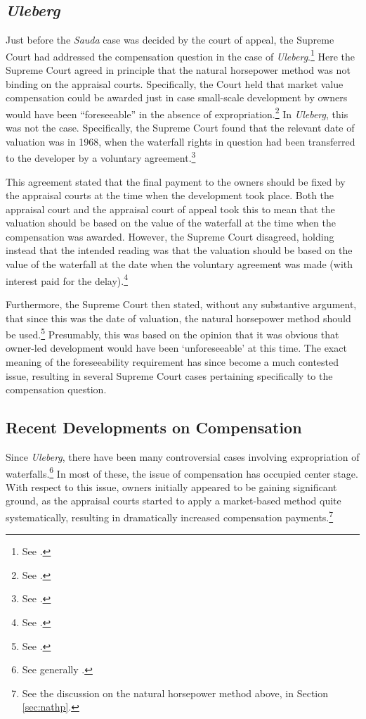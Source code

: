 \subsection{{\it Uleberg}}\label{sec:5:5:2}

Just before the {\it Sauda} case was decided by the court of appeal, the Supreme Court had addressed the compensation question in the case of {\it Uleberg}.\footnote{See \cite{uleberg08}.} Here the Supreme Court agreed in principle that the natural horsepower method was not binding on the appraisal courts. Specifically, the Court held that market value compensation could be awarded just in case small-scale development by owners would have been ``foreseeable'' in the absence of expropriation.\footnote{See \cite[81]{uleberg08}.} In {\it Uleberg}, this was not the case. Specifically, the Supreme Court found that the relevant date of valuation was in 1968, when the waterfall rights in question had been transferred to the developer by a voluntary agreement.\footnote{See \cite[70]{uleberg08}.}

This agreement stated that the final payment to the owners should be fixed by the appraisal courts at the time when the development took place. Both the appraisal court and the appraisal court of appeal took this to mean that the valuation should be based on the value of the waterfall at the time when the compensation was awarded. However, the Supreme Court disagreed, holding instead that the intended reading was that the valuation should be based on the value of the waterfall at the date when the voluntary agreement was made (with interest paid for the delay).\footnote{See \cite[71]{uleberg08}.}

Furthermore, the Supreme Court then stated, without any substantive argument, that since this was the date of valuation, the natural horsepower method should be used.\footnote{See \cite[62]{uleberg08}.} Presumably, this was based on the opinion that it was obvious that owner-led development would have been `unforeseeable' at this time. The exact meaning of the foreseeability requirement has since become a much contested issue, resulting in several Supreme Court cases pertaining specifically to the compensation question.

\subsection{Recent Developments on Compensation}\label{sec:5:5:3}

Since {\it Uleberg}, there have been many controversial cases involving expropriation of waterfalls.\footnote{See generally \cite{larsen06,larsen08,larsen12}.} In most of these, the issue of compensation has occupied center stage. With respect to this issue, owners initially appeared to be gaining significant ground, as the appraisal courts started to apply a market-based method quite systematically, resulting in dramatically increased compensation payments.\footnote{See the discussion on the natural horsepower method above, in Section \ref{sec:nathp}.}

